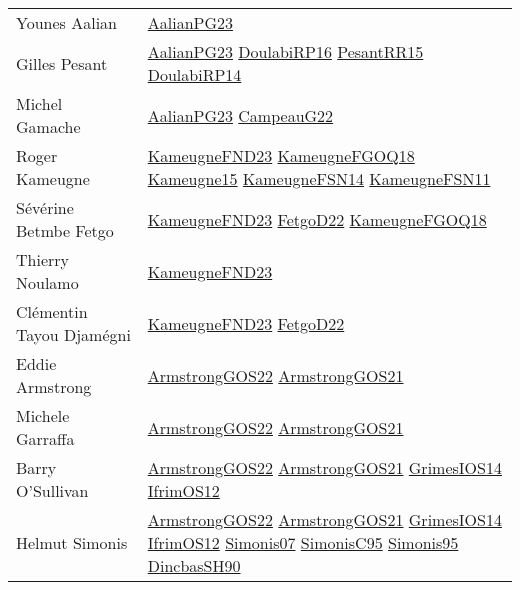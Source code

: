 {\begin{longtable}{p{4cm}p{15cm}}
Younes Aalian & \href{papers/AalianPG23.pdf}{AalianPG23}\cite{AalianPG23} \\
Gilles Pesant & \href{papers/AalianPG23.pdf}{AalianPG23}\cite{AalianPG23} \href{articles/DoulabiRP16.pdf}{DoulabiRP16}\cite{DoulabiRP16} \href{papers/PesantRR15.pdf}{PesantRR15}\cite{PesantRR15} \href{papers/DoulabiRP14.pdf}{DoulabiRP14}\cite{DoulabiRP14} \\
Michel Gamache & \href{papers/AalianPG23.pdf}{AalianPG23}\cite{AalianPG23} \href{articles/CampeauG22.pdf}{CampeauG22}\cite{CampeauG22} \\
Roger Kameugne & \href{papers/KameugneFND23.pdf}{KameugneFND23}\cite{KameugneFND23} \href{papers/KameugneFGOQ18.pdf}{KameugneFGOQ18}\cite{KameugneFGOQ18} \href{articles/Kameugne15.pdf}{Kameugne15}\cite{Kameugne15} \href{articles/KameugneFSN14.pdf}{KameugneFSN14}\cite{KameugneFSN14} \href{papers/KameugneFSN11.pdf}{KameugneFSN11}\cite{KameugneFSN11} \\
S{\'{e}}v{\'{e}}rine Betmbe Fetgo & \href{papers/KameugneFND23.pdf}{KameugneFND23}\cite{KameugneFND23} \href{articles/FetgoD22.pdf}{FetgoD22}\cite{FetgoD22} \href{papers/KameugneFGOQ18.pdf}{KameugneFGOQ18}\cite{KameugneFGOQ18} \\
Thierry Noulamo & \href{papers/KameugneFND23.pdf}{KameugneFND23}\cite{KameugneFND23} \\
Cl{\'{e}}mentin Tayou Djam{\'{e}}gni & \href{papers/KameugneFND23.pdf}{KameugneFND23}\cite{KameugneFND23} \href{articles/FetgoD22.pdf}{FetgoD22}\cite{FetgoD22} \\
Eddie Armstrong & \href{papers/ArmstrongGOS22.pdf}{ArmstrongGOS22}\cite{ArmstrongGOS22} \href{papers/ArmstrongGOS21.pdf}{ArmstrongGOS21}\cite{ArmstrongGOS21} \\
Michele Garraffa & \href{papers/ArmstrongGOS22.pdf}{ArmstrongGOS22}\cite{ArmstrongGOS22} \href{papers/ArmstrongGOS21.pdf}{ArmstrongGOS21}\cite{ArmstrongGOS21} \\
Barry O'Sullivan & \href{papers/ArmstrongGOS22.pdf}{ArmstrongGOS22}\cite{ArmstrongGOS22} \href{papers/ArmstrongGOS21.pdf}{ArmstrongGOS21}\cite{ArmstrongGOS21} \href{articles/GrimesIOS14.pdf}{GrimesIOS14}\cite{GrimesIOS14} \href{papers/IfrimOS12.pdf}{IfrimOS12}\cite{IfrimOS12} \\
Helmut Simonis & \href{papers/ArmstrongGOS22.pdf}{ArmstrongGOS22}\cite{ArmstrongGOS22} \href{papers/ArmstrongGOS21.pdf}{ArmstrongGOS21}\cite{ArmstrongGOS21} \href{articles/GrimesIOS14.pdf}{GrimesIOS14}\cite{GrimesIOS14} \href{papers/IfrimOS12.pdf}{IfrimOS12}\cite{IfrimOS12} \href{articles/Simonis07.pdf}{Simonis07}\cite{Simonis07} \href{papers/SimonisC95.pdf}{SimonisC95}\cite{SimonisC95} \href{papers/Simonis95.pdf}{Simonis95}\cite{Simonis95} \href{articles/DincbasSH90.pdf}{DincbasSH90}\cite{DincbasSH90} \\

\end{longtable}}
